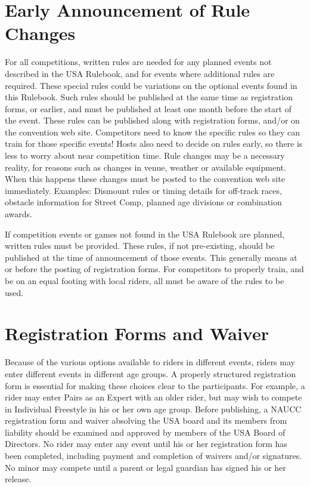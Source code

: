 \section{Early Announcement of Rule Changes}
For all competitions, written rules are needed for any planned events not described in the USA Rulebook, and for events where additional rules are required.
These special rules could be variations on the optional events found in this Rulebook.
Such rules should be published at the same time as registration forms, or earlier, and must be published at least one month before the start of the event.
These rules can be published along with registration forms, and/or on the convention web site.
Competitors need to know the specific rules so they can train for those specific events!
Hosts also need to decide on rules early, so there is less to worry about near competition time.
Rule changes may be a necessary reality, for reasons such as changes in venue, weather or available equipment.
When this happens these changes must be posted to the convention web site immediately.
Examples: Dismount rules or timing details for off-track races, obstacle information for Street Comp, planned age divisions or combination awards.

If competition events or games not found in the USA Rulebook are planned, written rules must be provided.
These rules, if not pre-existing, should be published at the time of announcement of those events.
This generally means at or before the posting of registration forms.
For competitors to properly train, and be on an equal footing with local riders, all must be aware of the rules to be used.

\section{Registration Forms and Waiver}
Because of the various options available to riders in different events, riders may enter different events in different age groups.
A properly structured registration form is essential for making these choices clear to the participants.
For example, a rider may enter Pairs as an Expert with an older rider, but may wish to compete in Individual Freestyle in his or her own age group.
Before publishing, a NAUCC registration form and waiver absolving the USA board and its members from liability should be examined and approved by members of the USA Board of Directors.
No rider may enter any event until his or her registration form has been completed, including payment and completion of waivers and/or signatures.
No minor may compete until a parent or legal guardian has signed his or her release.

